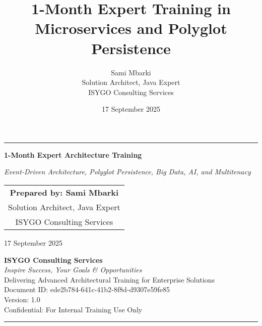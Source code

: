 \documentclass[11pt]{article}
\begin{document}
\begin{titlepage}
    \centering
    \vspace*{1cm}
    \vspace{0.5cm}
    {\color{blue}\hrule height 2pt}
    \vspace{0.5cm}
    {\LARGE \textbf{1-Month Expert Architecture Training}\par}
    \vspace{0.3cm}
    {\large \textit{Event-Driven Architecture, Polyglot Persistence, Big Data, AI, and Multitenacy}\par}
    \vspace{1.5cm}
    \begin{tabular}{c}
        \large \textbf{Prepared by: Sami Mbarki} \\
        \large Solution Architect, Java Expert \\
        \large ISYGO Consulting Services \\
    \end{tabular}
    \vspace{1cm}
    {\large 17 September 2025 \par}
    \vfill
    \begin{minipage}{0.8\textwidth}
        \centering
        \small \textbf{ISYGO Consulting Services} \\
        \small \textit{Inspire Success, Your Goals \& Opportunities} \\
        \small Delivering Advanced Architectural Training for Enterprise Solutions \\
        \vspace{0.5cm}
        \small Document ID: ede2b784-641c-41b2-8f8d-d9307e59fe85 \\
        \small Version: 1.0 \\
        \small Confidential: For Internal Training Use Only
    \end{minipage}
    {\color{blue}\hrule height 2pt}
\end{titlepage}

\pagestyle{fancy}
\title{1-Month Expert Training in Microservices and Polyglot Persistence}
\author{Sami Mbarki \\ Solution Architect, Java Expert \\ ISYGO Consulting Services}
\date{17 September 2025}
\maketitle
\end{document}
